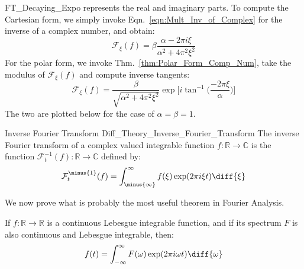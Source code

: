 \begin{lexample}{}{FT_Decaying_Expo}
            represents the real and imaginary parts. To
            compute the Cartesian form, we simply invoke
            Eqn.~\ref{eqn:Mult_Inv_of_Complex} for the inverse
            of a complex number, and obtain:
            \begin{equation}
                \mathcal{F}_{\xi}(f)
                =\beta\frac{\alpha-2\pi{i}\xi}
                    {\alpha^{2}+4\pi^{2}\xi^{2}}
            \end{equation}
            For the polar form, we invoke
            Thm.~\ref{thm:Polar_Form_Comp_Num},
            take the modulus of $\mathcal{F}_{\xi}(f)$
            and compute inverse tangents:
            \begin{equation}
                \mathcal{F}_{\xi}(f)=
                \frac{\beta}{\sqrt{\alpha^{2}+4\pi^{2}\xi^{2}}}
                \exp\Big[i\tan^{\minus{1}}
                    \Big(\frac{\minus{2}\pi\xi}{\alpha}\Big)
                \Big]
            \end{equation}
            The two are plotted below for the case of
            $\alpha=\beta=1$.
        \end{lexample}
        \begin{ldefinition}{Inverse Fourier Transform}
              {Diff_Theory_Inverse_Fourier_Transform}
            The inverse Fourier transform of a complex valued
            integrable function
            $f:\mathbb{R}\rightarrow\mathbb{C}$ is the function
            $\mathcal{F}_{t}^{\minus{1}}(f):%
                \mathbb{R}\rightarrow\mathbb{C}$ defined by:
            \begin{equation}
                \mathcal{F}_{t}^{\minus{1}}(f)=
                \int_{\minus{\infty}}^{\infty}
                    f(\xi)\exp(2\pi{i}\xi{t})\diff{\xi}
            \end{equation}
        \end{ldefinition}
        We now prove what is probably the most useful theorem
        in Fourier Analysis.
        \begin{theorem}
            If $f:\mathbb{R}\rightarrow\mathbb{R}$ is a
            continuous Lebesgue integrable function,
            and if its spectrum $F$ is also continuous
            and Lebesgue integrable, then:
            \begin{equation}
                f(t)=\int_{-\infty}^{\infty}F(\omega)
                \exp(2\pi{i}\omega{t})\diff{\omega}
            \end{equation}
        \end{theorem}

